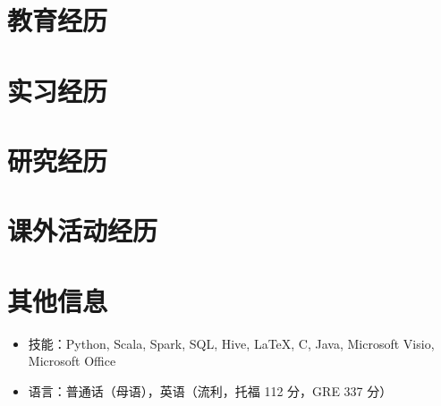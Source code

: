 \documentclass{resumeZH}
\begin{document}
\section{教育经历}

\thuundergrad
\umnexchange

\section{实习经历}

\bytedance
\continental
\summitview

\section{研究经历}

\umnresearch
\fifaresearch

\section{课外活动经历}

\eydatascience
\cydp
\tkd
\semtech

\section{其他信息}

\vspace{0.618ex}
\begin{itemize}
\item 技能：Python, Scala, Spark, SQL, Hive, {\LaTeX}, C, Java, Microsoft Visio, Microsoft Office
\item 语言：普通话（母语），英语（流利，托福 112 分，GRE 337 分）
\end{itemize}
\end{document}
